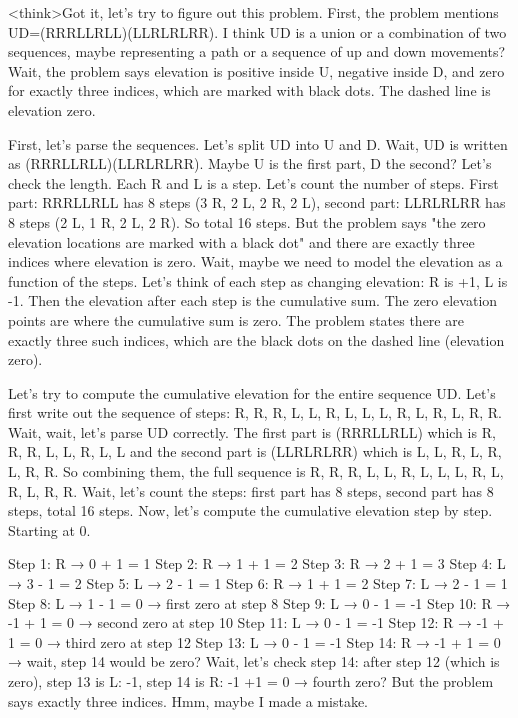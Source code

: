 <think>Got it, let's try to figure out this problem. First, the problem mentions UD=(RRRLLRLL)(LLRLRLRR). I think UD is a union or a combination of two sequences, maybe representing a path or a sequence of up and down movements? Wait, the problem says elevation is positive inside U, negative inside D, and zero for exactly three indices, which are marked with black dots. The dashed line is elevation zero.

First, let's parse the sequences. Let's split UD into U and D. Wait, UD is written as (RRRLLRLL)(LLRLRLRR). Maybe U is the first part, D the second? Let's check the length. Each R and L is a step. Let's count the number of steps. First part: RRRLLRLL has 8 steps (3 R, 2 L, 2 R, 2 L), second part: LLRLRLRR has 8 steps (2 L, 1 R, 2 L, 2 R). So total 16 steps. But the problem says "the zero elevation locations are marked with a black dot" and there are exactly three indices where elevation is zero. Wait, maybe we need to model the elevation as a function of the steps. Let's think of each step as changing elevation: R is +1, L is -1. Then the elevation after each step is the cumulative sum. The zero elevation points are where the cumulative sum is zero. The problem states there are exactly three such indices, which are the black dots on the dashed line (elevation zero).

Let's try to compute the cumulative elevation for the entire sequence UD. Let's first write out the sequence of steps: R, R, R, L, L, R, L, L, L, R, L, R, L, R, R. Wait, wait, let's parse UD correctly. The first part is (RRRLLRLL) which is R, R, R, L, L, R, L, L and the second part is (LLRLRLRR) which is L, L, R, L, R, L, R, R. So combining them, the full sequence is R, R, R, L, L, R, L, L, L, R, L, R, L, R, R. Wait, let's count the steps: first part has 8 steps, second part has 8 steps, total 16 steps. Now, let's compute the cumulative elevation step by step. Starting at 0.

Step 1: R → 0 + 1 = 1
Step 2: R → 1 + 1 = 2
Step 3: R → 2 + 1 = 3
Step 4: L → 3 - 1 = 2
Step 5: L → 2 - 1 = 1
Step 6: R → 1 + 1 = 2
Step 7: L → 2 - 1 = 1
Step 8: L → 1 - 1 = 0 → first zero at step 8
Step 9: L → 0 - 1 = -1
Step 10: R → -1 + 1 = 0 → second zero at step 10
Step 11: L → 0 - 1 = -1
Step 12: R → -1 + 1 = 0 → third zero at step 12
Step 13: L → 0 - 1 = -1
Step 14: R → -1 + 1 = 0 → wait, step 14 would be zero? Wait, let's check step 14: after step 12 (which is zero), step 13 is L: -1, step 14 is R: -1 +1 = 0 → fourth zero? But the problem says exactly three indices. Hmm, maybe I made a mistake.

